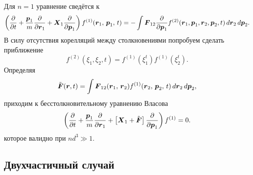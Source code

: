 Для $n=1$ уравнение сведётся к
\begin{equation*}
	\left(
		\frac{\partial }{\partial t} + \frac{\boldsymbol{p}_1}{m} \frac{\partial }{\partial \boldsymbol{r}_1} + \boldsymbol{X}_1 \frac{\partial }{\partial \boldsymbol{p}_1} 
	\right) f^{(1)} (\boldsymbol{r}_1,\, \boldsymbol{p}_1,\, t) = - \int \boldsymbol{F}_{12} 
	\frac{\partial }{\partial \boldsymbol{p}_1} f^{(2)}(\boldsymbol{r}_1, \boldsymbol{p}_1, \boldsymbol{r}_2, \boldsymbol{p}_2, t) \, d \boldsymbol{r}_2 \, d \boldsymbol{p}_2.
\end{equation*}
В силу отсутствия корелляций между столкновениями попробуем сделать приближение
\begin{equation*}
 	f^{(2)}(\xi_1, \xi_2, t) = f^{(1)} (\xi_1^t)f^{(1)}(\xi_2^t).
\end{equation*}
Определяя
\begin{equation*}
	\tilde{\boldsymbol{F}} (\boldsymbol{r}, t) = \int \boldsymbol{F}_{12} (\boldsymbol{r}_1,\, \boldsymbol{r}_2) f^{(1)} (\boldsymbol{r}_2,\, \boldsymbol{p}_2,\, t) \, d \boldsymbol{r}_2 \, d \boldsymbol{p}_2,
\end{equation*}
приходим к бесстолкновительному уравнению Власова 
\begin{equation}
	\left(
		\frac{\partial }{\partial t} + \frac{\boldsymbol{p}_1}{m} \frac{\partial }{\partial \boldsymbol{r}_1}  + \left[
			\boldsymbol{X}_1 + \tilde{\boldsymbol{F}}
		\right] \frac{\partial }{\partial \boldsymbol{p}_1} 
	\right) f^{(1)} = 0.
\end{equation}
которое валидно при $n d^3 \gg 1$. 




\subsection*{Двухчастичный случай}

